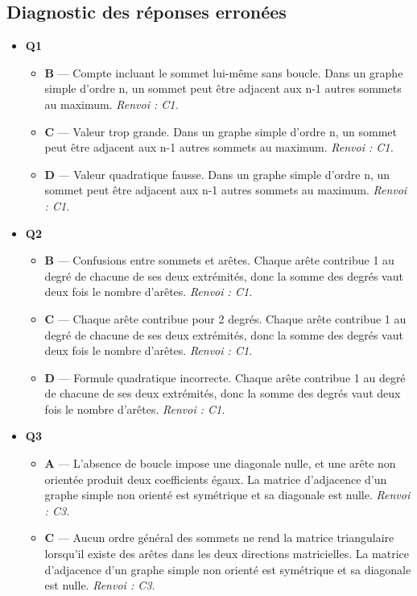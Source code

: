 \subsection*{Diagnostic des réponses erronées}

\begin{itemize}
  \item \textbf{Q1}
  \begin{itemize}
    \item \textbf{B} — Compte incluant le sommet lui-même sans boucle. Dans un graphe simple d'ordre n, un sommet peut être adjacent aux n-1 autres sommets au maximum. \emph{Renvoi : C1.}
    \item \textbf{C} — Valeur trop grande. Dans un graphe simple d'ordre n, un sommet peut être adjacent aux n-1 autres sommets au maximum. \emph{Renvoi : C1.}
    \item \textbf{D} — Valeur quadratique fausse. Dans un graphe simple d'ordre n, un sommet peut être adjacent aux n-1 autres sommets au maximum. \emph{Renvoi : C1.}
  \end{itemize}
  \item \textbf{Q2}
  \begin{itemize}
    \item \textbf{B} — Confusions entre sommets et arêtes. Chaque arête contribue 1 au degré de chacune de ses deux extrémités, donc la somme des degrés vaut deux fois le nombre d'arêtes. \emph{Renvoi : C1.}
    \item \textbf{C} — Chaque arête contribue pour 2 degrés. Chaque arête contribue 1 au degré de chacune de ses deux extrémités, donc la somme des degrés vaut deux fois le nombre d'arêtes. \emph{Renvoi : C1.}
    \item \textbf{D} — Formule quadratique incorrecte. Chaque arête contribue 1 au degré de chacune de ses deux extrémités, donc la somme des degrés vaut deux fois le nombre d'arêtes. \emph{Renvoi : C1.}
  \end{itemize}
  \item \textbf{Q3}
  \begin{itemize}
    \item \textbf{A} — L'absence de boucle impose une diagonale nulle, et une arête non orientée produit deux coefficients égaux. La matrice d'adjacence d'un graphe simple non orienté est symétrique et sa diagonale est nulle. \emph{Renvoi : C3.}
    \item \textbf{C} — Aucun ordre général des sommets ne rend la matrice triangulaire lorsqu'il existe des arêtes dans les deux directions matricielles. La matrice d'adjacence d'un graphe simple non orienté est symétrique et sa diagonale est nulle. \emph{Renvoi : C3.}

\end{itemize}
\end{itemize}
